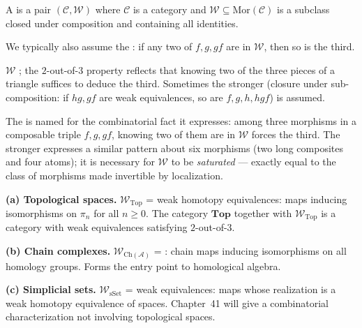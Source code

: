 \begin{definition}
\label{def:cat-with-we}
A  is a pair $(\mathcal{C}, \mathcal{W})$
where $\mathcal{C}$ is a category and $\mathcal{W} \subseteq
\mathrm{Mor}(\mathcal{C})$ is a subclass closed under composition and
containing all identities.

We typically also assume the : if any two
of $f, g, gf$ are in $\mathcal{W}$, then so is the third.
\end{definition}

\begin{howtosay}
$\mathcal{W}$ ; the $2$-out-of-$3$
property  reflects that knowing two of the
three pieces of a triangle suffices to deduce the third. Sometimes the
stronger  (closure under sub-composition:
if $hg, gf$ are weak equivalences, so are $f, g, h, hgf$) is assumed.
\end{howtosay}

\begin{nameorigin}
The  is named for the combinatorial fact
it expresses: among three morphisms in a composable triple $f, g, gf$,
knowing two of them are in $\mathcal{W}$ forces the third. The
stronger  expresses a similar pattern
about six morphisms (two long composites and four atoms); it is
necessary for $\mathcal{W}$ to be \emph{saturated} — exactly equal to
the class of morphisms made invertible by localization.
\end{nameorigin}

\begin{example_thm}
\label{ex:we-examples}
\textbf{(a) Topological spaces.} $\mathcal{W}_{\mathrm{Top}}$ = weak
homotopy equivalences: maps inducing isomorphisms on $\pi_n$ for all
$n \geq 0$. The category $\mathbf{Top}$ together with
$\mathcal{W}_{\mathrm{Top}}$ is a category with weak equivalences
satisfying $2$-out-of-$3$.

\textbf{(b) Chain complexes.} $\mathcal{W}_{\mathrm{Ch}(\mathcal{A})}$ =
: chain maps inducing isomorphisms on all
homology groups. Forms the entry point to homological algebra.

\textbf{(c) Simplicial sets.} $\mathcal{W}_{\mathrm{sSet}}$ = weak
equivalences: maps whose realization is a weak homotopy equivalence of
spaces. Chapter~41 will give a combinatorial characterization not
involving topological spaces.
\end{example_thm}


